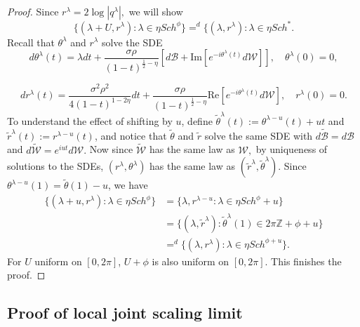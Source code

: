 \documentclass[12pt, reqno]{amsart}
\theoremstyle{definition}
\theoremstyle{remark}
\numberwithin{equation}{section}
\begin{document}
\begin{proof}
Since $r^\lambda=2\log|q^\lambda|,$ we will show 
$$
\{(\lambda+U,r^\lambda):\lambda\in \eta Sch^\phi\}=^d \{(\lambda,r^\lambda):\lambda\in \eta Sch^*.
$$
Recall that $\theta^\lambda$ and $r^\lambda$ solve the SDE
\begin{equation}
    d\theta^\lambda(t)=\lambda dt+\frac{\sigma\rho}{(1-t)^{\frac{1}{2}-\eta}}[d\mathcal{B}+\text{Im}[e^{-i\theta^\lambda(t)}d\mathcal{W}]],\quad \theta^\lambda(0)=0,
\end{equation}

\begin{equation}
dr^\lambda(t)=\frac{\sigma^2\rho^2}{4(1-t)^{1-2\eta}}dt+\frac{\sigma\rho}{(1-t)^{\frac{1}{2}-\eta}}\text{Re}[e^{-i\theta^\lambda(t)}d\mathcal{W}],\quad r^\lambda(0)=0.
\end{equation}
To understand the effect of shifting by $u$, define $\tilde{\theta}^\lambda(t):=\theta^{\lambda-u}(t)+ut$ and $\tilde{r}^\lambda(t):=r^{\lambda-u}(t)$, and notice that $\tilde{\theta}$ and $\tilde{r}$ solve the same SDE with $d\widetilde{\mathcal{B}}=d\mathcal{B}$ and $d\widetilde{\mathcal{W}}=e^{iut}d\mathcal{W}.$ 
    Now since $\widetilde{\mathcal{W}}$ has the same law as $\mathcal{W},$ by uniqueness of solutions to the SDEs, $(r^\lambda,\theta^\lambda)$ has the same law as $(\tilde{r}^\lambda,\tilde{\theta}^\lambda)$. Since $\theta^{\lambda-u}(1)=\tilde{\theta}(1)-u$, we have
$$ \begin{aligned}  \{(\lambda+u,r^\lambda):\lambda\in \eta Sch^\phi\}
&=\{\lambda,r^{\lambda-u}:\lambda\in\eta Sch^\phi+u\}
\\ &=\{(\lambda,\tilde{r}^\lambda):\tilde{\theta}^\lambda(1)\in 2\pi \mathbb{Z}+\phi+u\}
\\&=^d \{(\lambda,r^\lambda):\lambda\in \eta Sch^{\phi+u}\}. \end{aligned}
$$
    For $U$ uniform on $[0,2\pi]$, $U+\phi$ is also uniform on $[0,2\pi]$. This finishes the proof.
\end{proof}









\subsection{Proof of local joint scaling limit}
\end{document}
